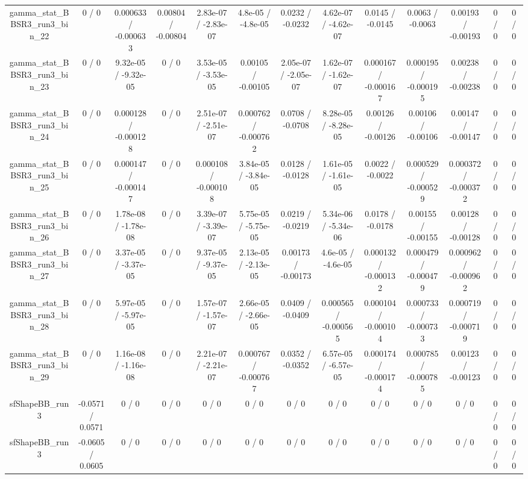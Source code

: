 \documentclass[10pt]{article}
\begin{document}
\begin{table}[htbp]
\begin{center}
\begin{tabular}{|c|c|c|c|c|c|c|c|c|c|c|c|c|}
  gamma_stat_BBSR3_run3_bin_22 & 0 / 0 & 0.000633 / -0.000633 & 0.00804 / -0.00804 & 2.83e-07 / -2.83e-07 & 4.8e-05 / -4.8e-05 & 0.0232 / -0.0232 & 4.62e-07 / -4.62e-07 & 0.0145 / -0.0145 & 0.0063 / -0.0063 & 0.00193 / -0.00193 & 0 / 0 & 0 / 0 \\ 
  gamma_stat_BBSR3_run3_bin_23 & 0 / 0 & 9.32e-05 / -9.32e-05 & 0 / 0 & 3.53e-05 / -3.53e-05 & 0.00105 / -0.00105 & 2.05e-07 / -2.05e-07 & 1.62e-07 / -1.62e-07 & 0.000167 / -0.000167 & 0.000195 / -0.000195 & 0.00238 / -0.00238 & 0 / 0 & 0 / 0 \\ 
  gamma_stat_BBSR3_run3_bin_24 & 0 / 0 & 0.000128 / -0.000128 & 0 / 0 & 2.51e-07 / -2.51e-07 & 0.000762 / -0.000762 & 0.0708 / -0.0708 & 8.28e-05 / -8.28e-05 & 0.00126 / -0.00126 & 0.00106 / -0.00106 & 0.00147 / -0.00147 & 0 / 0 & 0 / 0 \\ 
  gamma_stat_BBSR3_run3_bin_25 & 0 / 0 & 0.000147 / -0.000147 & 0 / 0 & 0.000108 / -0.000108 & 3.84e-05 / -3.84e-05 & 0.0128 / -0.0128 & 1.61e-05 / -1.61e-05 & 0.0022 / -0.0022 & 0.000529 / -0.000529 & 0.000372 / -0.000372 & 0 / 0 & 0 / 0 \\ 
  gamma_stat_BBSR3_run3_bin_26 & 0 / 0 & 1.78e-08 / -1.78e-08 & 0 / 0 & 3.39e-07 / -3.39e-07 & 5.75e-05 / -5.75e-05 & 0.0219 / -0.0219 & 5.34e-06 / -5.34e-06 & 0.0178 / -0.0178 & 0.00155 / -0.00155 & 0.00128 / -0.00128 & 0 / 0 & 0 / 0 \\ 
  gamma_stat_BBSR3_run3_bin_27 & 0 / 0 & 3.37e-05 / -3.37e-05 & 0 / 0 & 9.37e-05 / -9.37e-05 & 2.13e-05 / -2.13e-05 & 0.00173 / -0.00173 & 4.6e-05 / -4.6e-05 & 0.000132 / -0.000132 & 0.000479 / -0.000479 & 0.000962 / -0.000962 & 0 / 0 & 0 / 0 \\ 
  gamma_stat_BBSR3_run3_bin_28 & 0 / 0 & 5.97e-05 / -5.97e-05 & 0 / 0 & 1.57e-07 / -1.57e-07 & 2.66e-05 / -2.66e-05 & 0.0409 / -0.0409 & 0.000565 / -0.000565 & 0.000104 / -0.000104 & 0.000733 / -0.000733 & 0.000719 / -0.000719 & 0 / 0 & 0 / 0 \\ 
  gamma_stat_BBSR3_run3_bin_29 & 0 / 0 & 1.16e-08 / -1.16e-08 & 0 / 0 & 2.21e-07 / -2.21e-07 & 0.000767 / -0.000767 & 0.0352 / -0.0352 & 6.57e-05 / -6.57e-05 & 0.000174 / -0.000174 & 0.000785 / -0.000785 & 0.00123 / -0.00123 & 0 / 0 & 0 / 0 \\ 
  sfShapeBB_run3 & -0.0571 / 0.0571 & 0 / 0 & 0 / 0 & 0 / 0 & 0 / 0 & 0 / 0 & 0 / 0 & 0 / 0 & 0 / 0 & 0 / 0 & 0 / 0 & 0 / 0 \\ 
  sfShapeBB_run3 & -0.0605 / 0.0605 & 0 / 0 & 0 / 0 & 0 / 0 & 0 / 0 & 0 / 0 & 0 / 0 & 0 / 0 & 0 / 0 & 0 / 0 & 0 / 0 & 0 / 0 \\ 

\end{tabular}
\end{center}
\end{table}
\end{document}

